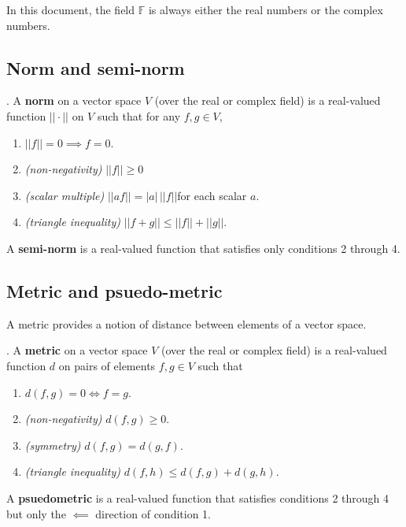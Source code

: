 \documentclass{article} %
\begin{document}
In this document, the field $\mathbb{F}$ is always either the real numbers or the complex numbers.  

\subsection{Norm and semi-norm} \label{sec:norm_and_semi_norm}


\begin{definition} \cite[pp.87]{ash2000probability}. 
A \textbf{norm} on a vector space $V$ (over the real or complex field) is a real-valued function $|| \cdot||$ on $V$ such that for any $f,g \in V$,
\begin{enumerate}
\item $||f|| =0 \implies f=0$.
\item \textit{(non-negativity)} $||f|| \geq 0$
\item \textit{(scalar multiple)} $||af|| = |a| \, ||f||$for each scalar $a$.
\item \textit{(triangle inequality)} $||f+g|| \leq ||f|| + ||g||$.
\end{enumerate}
A \textbf{semi-norm} is a real-valued function that satisfies only conditions 2 through 4.
\label{def:norm_and_semi_norm}
\end{definition}

\subsection{Metric and psuedo-metric} \label{sec:metric_and_psuedometric}

A metric provides a notion of distance between elements of a vector space. 


\begin{definition} \cite[pp.87]{ash2000probability}. 
A \textbf{metric} on a vector space $V$ (over the real or complex field) is a real-valued function $d$ on pairs of elements $f,g  \in V$ such that  
\begin{enumerate}
\item $d(f,g) =0 \iff f=g$.
\item \textit{(non-negativity)} $d(f,g) \geq 0$. 
\item \textit{(symmetry)} $d(f,g)=d(g,f)$.
\item \textit{(triangle inequality)} $d(f,h) \leq d(f,g)+ d(g,h)$.
\end{enumerate}
A \textbf{psuedometric} is a real-valued function that satisfies conditions 2 through 4 but only the $\impliedby$ direction of condition 1.
\label{def:metric_and_psuedometric}
\end{definition}
\end{document}
